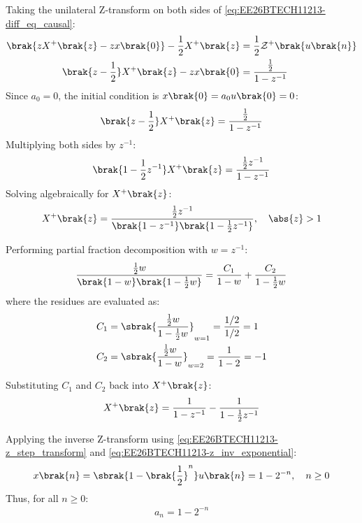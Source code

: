 \begin{enumerate}[label=\thesubsection.\arabic*, ref=\thesubsection.\theenumi,itemsep=0pt]
Taking the unilateral Z-transform on both sides of \eqref{eq:EE26BTECH11213-diff_eq_causal}:
\begin{align}
\brak{z X^+\brak{z} - z x\brak{0}} - \frac{1}{2} X^+\brak{z} &= \frac{1}{2} \mathcal{Z}^+\brak{u\brak{n}} \\
\brak{z - \frac{1}{2}} X^+\brak{z} - z x\brak{0} &= \frac{\frac{1}{2}}{1 - z^{-1}}
\end{align}
Since $a_0 = 0$, the initial condition is $x\brak{0} = a_0 u\brak{0} = 0$:
\begin{align}
\brak{z - \frac{1}{2}} X^+\brak{z} = \frac{\frac{1}{2}}{1 - z^{-1}}
\end{align}
Multiplying both sides by $z^{-1}$:
\begin{align}
\brak{1 - \frac{1}{2} z^{-1}} X^+\brak{z} = \frac{\frac{1}{2} z^{-1}}{1 - z^{-1}}
\end{align}
Solving algebraically for $X^+\brak{z}$:
\begin{align}
X^+\brak{z} = \frac{\frac{1}{2} z^{-1}}{\brak{1 - z^{-1}}\brak{1 - \frac{1}{2} z^{-1}}}, \quad \abs{z} > 1
\end{align}

Performing partial fraction decomposition with $w = z^{-1}$:
\begin{align}
\frac{\frac{1}{2} w}{\brak{1 - w}\brak{1 - \frac{1}{2} w}} = \frac{C_1}{1 - w} + \frac{C_2}{1 - \frac{1}{2} w}
\end{align}
where the residues are evaluated as:
\begin{align}
C_1 &= \sbrak{\frac{\frac{1}{2} w}{1 - \frac{1}{2} w}}_{w = 1} = \frac{1/2}{1/2} = 1 \\
C_2 &= \sbrak{\frac{\frac{1}{2} w}{1 - w}}_{w = 2} = \frac{1}{1 - 2} = -1
\end{align}

Substituting $C_1$ and $C_2$ back into $X^+\brak{z}$:
\begin{align}
X^+\brak{z} = \frac{1}{1 - z^{-1}} - \frac{1}{1 - \frac{1}{2} z^{-1}}
\end{align}

Applying the inverse Z-transform using \eqref{eq:EE26BTECH11213-z_step_transform} and \eqref{eq:EE26BTECH11213-z_inv_exponential}:
\begin{align}
x\brak{n} = \sbrak{1 - \brak{\frac{1}{2}}^n} u\brak{n} = 1 - 2^{-n}, \quad n \ge 0
\end{align}
Thus, for all $n \ge 0$:
\begin{align}
a_n = 1 - 2^{-n}
\end{align}


\end{enumerate}
